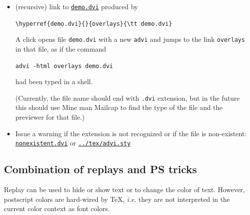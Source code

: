 \documentclass[12pt]{article}
\begin{document}
\begin {itemize}

\item
(recursive) link to \hyperref{demo.dvi}{}{overlays}{\tt demo.dvi}
produced by

\qquad\verb"\hyperref{demo.dvi}{}{overlays}{\tt demo.dvi}"

A click opens file \verb"demo.dvi" with a new \verb"advi" and jumps to the
link \verb"overlays" in that file, as if the command

\qquad\verb"advi -html overlays demo.dvi"

had been typed in a shell.

(Currently, the file name should end with \verb".dvi" extension, but in the
future this should use Mine man Mailcap to find the type of the file and the
previewer for that file.)


\item
Issue a warning if the extension is not recognized or if the 
file is non-existent:
\hyperref{nonexistent.dvi}{}{}{\tt nonexistent.dvi}
or
\hyperref{../tex/advi.sty}{}{}{\tt ../tex/advi.sty}



\end {itemize}


\newpage

\subsection* {Combination of replays and PS tricks}

Replay can be used to hide or show text or to change the color of text. 
However, postscript colors are hard-wired by {\TeX}, {\em i.e.} they are not
interpreted in the current color context as font colors. 
\end{document}
